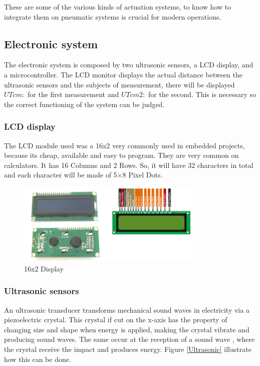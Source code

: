 \documentclass[transmag]{IEEEtran}
\begin{document}
These are some of the various kinds of actuation systems, to know how to integrate them on pneumatic systems is crucial for modern operations. 





\subsection{Electronic system}

The electronic system is composed by two ultrasonic sensors, a LCD display, and a microcontroller. The LCD monitor displays the actual distance between the ultrasonic sensors and the subjects of measurement, there will be displayed $UT cm:$ for the first measurement and $UT cm2:$ for the second. This is necessary so the correct functioning of the system can be judged. 


\subsubsection{LCD display}

The LCD module used was a 16x2 very commonly used in embedded projects, because its cheap, available and easy to program. They are very common on calculators. It has 16 Columns and 2 Rows. So, it will have 32 characters in total and each character will be made of 5×8 Pixel Dots. \cite{ref4}

\begin{figure}[h]
\centerline{\includegraphics[width=3.5in]{./images/Display}}
\caption{16x2 Display\label{Display}}
\end{figure}

\subsubsection{Ultrasonic sensors}

An ultrasonic transducer transforms mechanical sound waves in electricity via a piezoelectric crystal. This crystal if cut on the x-axis has the property of changing size and shape when energy is applied, making the crystal vibrate and producing sound waves. The same occur at the reception of a sound wave , where the crystal receive the impact and produces energy. Figure \ref{Ultrasonic} illustrate how this can be done. \cite{ref6}
\end{document}

